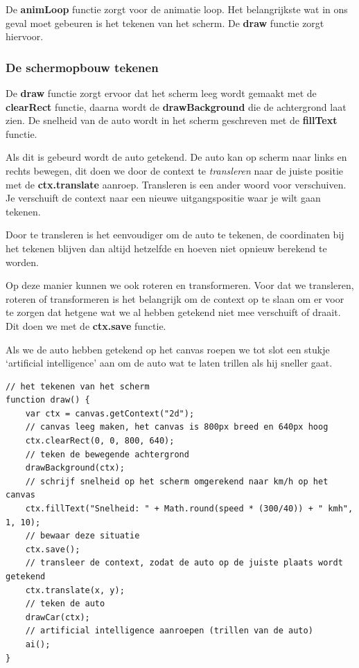 \documentclass[a4paper]{report}
\begin{document}
\noindent De \textbf{animLoop} functie zorgt voor de animatie loop. Het belangrijkste wat in ons geval moet gebeuren is het tekenen van het scherm. De \textbf{draw} functie zorgt hiervoor. 

\subsubsection*{De schermopbouw tekenen}

De \textbf{draw} functie zorgt ervoor dat het scherm leeg wordt gemaakt met de \textbf{clearRect} functie, daarna wordt de \textbf{drawBackground} die de achtergrond laat zien. De snelheid van de auto wordt in het scherm geschreven met de \textbf{fillText} functie.

Als dit is gebeurd wordt de auto getekend. De auto kan op scherm naar links en rechts bewegen, dit doen we door de context te \emph{transleren} naar de juiste positie met de \textbf{ctx.translate} aanroep. Transleren is een ander woord voor verschuiven. Je verschuift de context naar een nieuwe uitgangspositie waar je wilt gaan tekenen.

Door te transleren is het eenvoudiger om de auto te tekenen, de coordinaten bij het tekenen blijven dan altijd hetzelfde en hoeven niet opnieuw berekend te worden.

Op deze manier kunnen we ook roteren en transformeren. Voor dat we transleren, roteren of transformeren is het belangrijk om de context op te slaan om er voor te zorgen dat hetgene wat we al hebben getekend niet mee verschuift of draait. Dit doen we met de \textbf{ctx.save} functie.

Als we de auto hebben getekend op het canvas roepen we tot slot een stukje `artificial intelligence' aan om de auto wat te laten trillen als hij sneller gaat.

\begin{lstlisting}[numbers=none]
// het tekenen van het scherm
function draw() {
	var ctx = canvas.getContext("2d");
 	// canvas leeg maken, het canvas is 800px breed en 640px hoog
	ctx.clearRect(0, 0, 800, 640);
 	// teken de bewegende achtergrond
	drawBackground(ctx);
	// schrijf snelheid op het scherm omgerekend naar km/h op het canvas
	ctx.fillText("Snelheid: " + Math.round(speed * (300/40)) + " kmh", 1, 10);
  	// bewaar deze situatie
	ctx.save();
	// transleer de context, zodat de auto op de juiste plaats wordt getekend
	ctx.translate(x, y);
	// teken de auto
	drawCar(ctx);
	// artificial intelligence aanroepen (trillen van de auto)
	ai();
}
\end{lstlisting}
\end{document}
